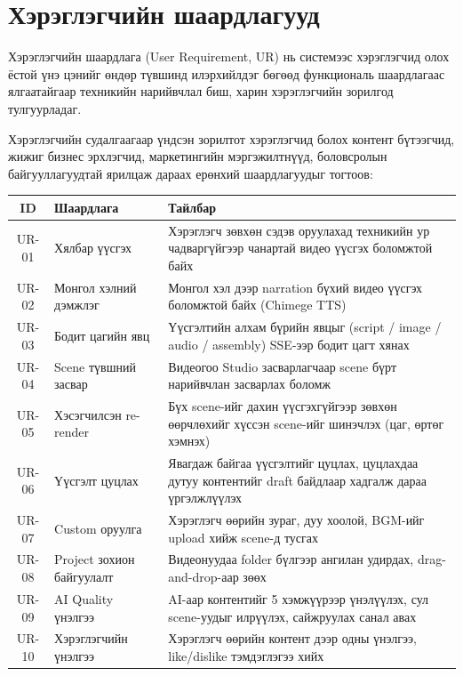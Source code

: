 \section{Хэрэглэгчийн шаардлагууд}

Хэрэглэгчийн шаардлага (User Requirement, UR) нь системээс хэрэглэгчид олох ёстой үнэ цэнийг өндөр түвшинд илэрхийлдэг бөгөөд функциональ шаардлагаас ялгаатайгаар техникийн нарийвчлал биш, харин хэрэглэгчийн зорилгод тулгуурладаг.

Хэрэглэгчийн судалгаагаар үндсэн зорилтот хэрэглэгчид болох контент бүтээгчид, жижиг бизнес эрхлэгчид, маркетингийн мэргэжилтнүүд, боловсролын байгууллагуудтай ярилцаж дараах ерөнхий шаардлагуудыг тогтоов:

\begin{table}[H]
\centering
\label{tab:user_req}
\small
\begin{tabular}{|c|p{3.5cm}|p{8.5cm}|}
\hline
\textbf{ID} & \textbf{Шаардлага} & \textbf{Тайлбар} \\
\hline
UR-01 & Хялбар үүсгэх & Хэрэглэгч зөвхөн сэдэв оруулахад техникийн ур чадваргүйгээр чанартай видео үүсгэх боломжтой байх \\
\hline
UR-02 & Монгол хэлний дэмжлэг & Монгол хэл дээр narration бүхий видео үүсгэх боломжтой байх (Chimege TTS) \\
\hline
UR-03 & Бодит цагийн явц & Үүсгэлтийн алхам бүрийн явцыг (script / image / audio / assembly) SSE-ээр бодит цагт хянах \\
\hline
UR-04 & Scene түвшний засвар & Видеогоо Studio засварлагчаар scene бүрт нарийвчлан засварлах боломж \\
\hline
UR-05 & Хэсэгчилсэн re-render & Бүх scene-ийг дахин үүсгэхгүйгээр зөвхөн өөрчлөхийг хүссэн scene-ийг шинэчлэх (цаг, өртөг хэмнэх) \\
\hline
UR-06 & Үүсгэлт цуцлах & Явагдаж байгаа үүсгэлтийг цуцлах, цуцлахдаа дутуу контентийг draft байдлаар хадгалж дараа үргэлжлүүлэх \\
\hline
UR-07 & Custom оруулга & Хэрэглэгч өөрийн зураг, дуу хоолой, BGM-ийг upload хийж scene-д тусгах \\
\hline
UR-08 & Project зохион байгуулалт & Видеонуудаа folder бүлгээр ангилан удирдах, drag-and-drop-аар зөөх \\
\hline
UR-09 & AI Quality үнэлгээ & AI-аар контентийг 5 хэмжүүрээр үнэлүүлэх, сул scene-уудыг илрүүлэх, сайжруулах санал авах \\
\hline
UR-10 & Хэрэглэгчийн үнэлгээ & Хэрэглэгч өөрийн контент дээр одны үнэлгээ, like/dislike тэмдэглэгээ хийх \\

\end{tabular}
\end{table}
